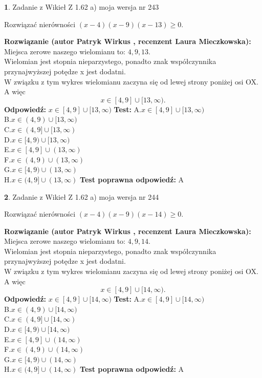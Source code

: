 \documentclass[12pt, a4paper]{article}
\theoremstyle{definition} %
\newtheorem{zad}{}
\newcommand{\zadStart}[1]{\begin{zad}#1\newline}
\newcommand{\zadStop}{\end{zad}}
\newcommand{\rozwStart}[2]{\noindent \textbf{Rozwiązanie (autor #1 , recenzent #2): }\newline}
\newcommand{\rozwStop}{\newline}
\newcommand{\odpStart}{\noindent \textbf{Odpowiedź:}\newline}
\newcommand{\odpStop}{\newline}
\newcommand{\testStart}{\noindent \textbf{Test:}\newline}
\newcommand{\testStop}{\newline}
\newcommand{\kluczStart}{\noindent \textbf{Test poprawna odpowiedź:}\newline}
\newcommand{\kluczStop}{\newline}
\begin{document}
\zadStart{Zadanie z Wikieł Z 1.62 a) moja wersja nr 243}

Rozwiązać nierówności $(x-4)(x-9)(x-13)\ge0$.
\zadStop
\rozwStart{Patryk Wirkus}{Laura Mieczkowska}
Miejsca zerowe naszego wielomianu to: $4, 9, 13$.\\
Wielomian jest stopnia nieparzystego, ponadto znak współczynnika przy\linebreak najwyższej potędze x jest dodatni.\\ W związku z tym wykres wielomianu zaczyna się od lewej strony poniżej osi OX. A więc $$x \in [4,9] \cup [13,\infty).$$
\rozwStop
\odpStart
$x \in [4,9] \cup [13,\infty)$
\odpStop
\testStart
A.$x \in [4,9] \cup [13,\infty)$\\
B.$x \in (4,9) \cup [13,\infty)$\\
C.$x \in (4,9] \cup [13,\infty)$\\
D.$x \in [4,9) \cup [13,\infty)$\\
E.$x \in [4,9] \cup (13,\infty)$\\
F.$x \in (4,9) \cup (13,\infty)$\\
G.$x \in [4,9) \cup (13,\infty)$\\
H.$x \in (4,9] \cup (13,\infty)$
\testStop
\kluczStart
A
\kluczStop



\zadStart{Zadanie z Wikieł Z 1.62 a) moja wersja nr 244}

Rozwiązać nierówności $(x-4)(x-9)(x-14)\ge0$.
\zadStop
\rozwStart{Patryk Wirkus}{Laura Mieczkowska}
Miejsca zerowe naszego wielomianu to: $4, 9, 14$.\\
Wielomian jest stopnia nieparzystego, ponadto znak współczynnika przy\linebreak najwyższej potędze x jest dodatni.\\ W związku z tym wykres wielomianu zaczyna się od lewej strony poniżej osi OX. A więc $$x \in [4,9] \cup [14,\infty).$$
\rozwStop
\odpStart
$x \in [4,9] \cup [14,\infty)$
\odpStop
\testStart
A.$x \in [4,9] \cup [14,\infty)$\\
B.$x \in (4,9) \cup [14,\infty)$\\
C.$x \in (4,9] \cup [14,\infty)$\\
D.$x \in [4,9) \cup [14,\infty)$\\
E.$x \in [4,9] \cup (14,\infty)$\\
F.$x \in (4,9) \cup (14,\infty)$\\
G.$x \in [4,9) \cup (14,\infty)$\\
H.$x \in (4,9] \cup (14,\infty)$
\testStop
\kluczStart
A
\kluczStop
\end{document}
